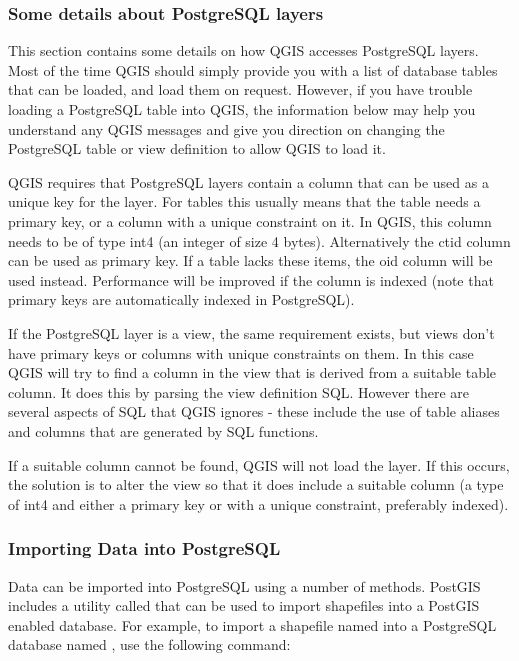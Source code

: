 \subsubsection{Some details about PostgreSQL
layers}\label{sec:postgis_details}

This section contains some details on how QGIS accesses PostgreSQL
layers. Most of the time QGIS should simply provide you with a list of
database tables that can be loaded, and load them on request. However,
if you have trouble loading a PostgreSQL table into QGIS, the information
below may help you understand any QGIS messages and give you direction on
changing the PostgreSQL table or view definition to allow QGIS to load it.

QGIS requires that PostgreSQL layers contain a column that can be
used as a unique key for the layer. For tables this usually means
that the table needs a primary key, or a column with a unique
constraint on it. In QGIS, this column needs to be of
type int4 (an integer of size 4 bytes). Alternatively the ctid column can be
used as primary key. If a table lacks these items,
the oid column will be used instead. Performance will be improved if the
column is indexed (note that primary keys are automatically indexed in
PostgreSQL). 

If the PostgreSQL layer is a view, the same requirement exists, but
views don't have primary keys or columns with unique constraints on
them. In this case QGIS will try to find a column in the view that is
derived from a suitable table column. It does this by parsing the view
definition SQL. However there are several aspects of SQL that QGIS ignores
- these include the use of table aliases and columns that are generated by
SQL functions.

If a suitable column cannot be found, QGIS will not load the layer. If this
occurs, the solution is to alter the view so that it does include a suitable
column (a type of int4 and either a primary key or with a unique constraint,
preferably indexed).


\subsubsection{Importing Data into PostgreSQL}\label{sec:loading_postgis_data}

Data can be imported into PostgreSQL using a number of methods. PostGIS
includes a utility called  that can be used to import shapefiles into
a PostGIS enabled database. For example, to import a shapefile named
into a PostgreSQL database named , use the following command:

